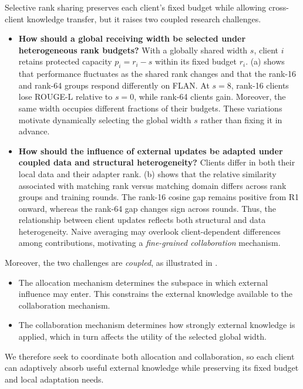Selective rank sharing preserves each client's fixed budget while allowing cross-client knowledge transfer, but it raises two coupled research challenges.
\begin{itemize}
    \item \textbf{How should a global receiving width be selected under heterogeneous rank budgets?}
    With a globally shared width $s$, client $i$ retains protected capacity $p_i=r_i-s$ within its fixed budget $r_i$.
    (a) shows that performance fluctuates as the shared rank changes and that the rank-16 and rank-64 groups respond differently on FLAN.
    At $s=8$, rank-16 clients lose ROUGE-L relative to $s=0$, while rank-64 clients gain.
    Moreover, the same width occupies different fractions of their budgets.
    These variations motivate dynamically selecting the global width $s$ rather than fixing it in advance.

    \item \textbf{How should the influence of external updates be adapted under coupled data and structural heterogeneity?}
    Clients differ in both their local data and their adapter rank.
    (b) shows that the relative similarity associated with matching rank versus matching domain differs across rank groups and training rounds.
    The rank-16 cosine gap remains positive from R1 onward, whereas the rank-64 gap changes sign across rounds.
    Thus, the relationship between client updates reflects both structural and data heterogeneity.
    Naive averaging may overlook client-dependent differences among contributions, motivating a \textit{fine-grained collaboration} mechanism.
\end{itemize}

Moreover, the two challenges are \textit{coupled}, as illustrated in .
\begin{itemize}
    \item The allocation mechanism determines the subspace in which external influence may enter.
    This constrains the external knowledge available to the collaboration mechanism.
    \item The collaboration mechanism determines how strongly external knowledge is applied, which in turn affects the utility of the selected global width.
\end{itemize}
We therefore seek to coordinate both allocation and collaboration, so each client can adaptively absorb useful external knowledge while preserving its fixed budget and local adaptation needs.

